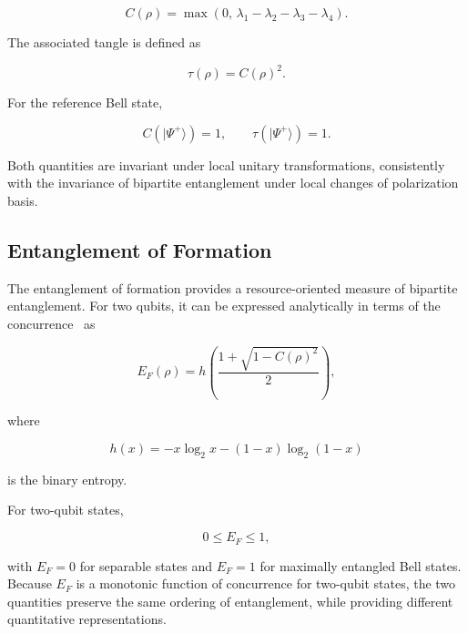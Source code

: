 \begin{equation}
C(\rho)
=
\max
\left(
0,\,
\lambda_1-\lambda_2-\lambda_3-\lambda_4
\right).
\label{eq:mixed_state_concurrence}
\end{equation}

The associated tangle is defined as

\begin{equation}
\tau(\rho)
=
C(\rho)^2.
\label{eq:tangle_definition}
\end{equation}

For the reference Bell state,

\begin{equation}
C(|\Psi^+\rangle)=1,
\qquad
\tau(|\Psi^+\rangle)=1.
\end{equation}

Both quantities are invariant under local unitary transformations, consistently
with the invariance of bipartite entanglement under local changes of polarization
basis.


\subsection{Entanglement of Formation}
\label{subsec:entanglement_of_formation}

The entanglement of formation provides a resource-oriented measure of bipartite
entanglement. For two qubits, it can be expressed analytically in terms of the
concurrence~\cite{wootters_entanglement_1998} as

\begin{equation}
E_F(\rho)
=
h
\left(
\frac{
1+\sqrt{1-C(\rho)^2}
}{2}
\right),
\label{eq:eof_definition}
\end{equation}

where

\begin{equation}
h(x)
=
-x\log_2x
-
(1-x)\log_2(1-x)
\label{eq:binary_entropy_function}
\end{equation}

is the binary entropy.

For two-qubit states,

\begin{equation}
0\leq E_F\leq1,
\end{equation}

with \(E_F=0\) for separable states and \(E_F=1\) for maximally entangled
Bell states. Because \(E_F\) is a monotonic function of concurrence for
two-qubit states, the two quantities preserve the same ordering of entanglement,
while providing different quantitative representations.

